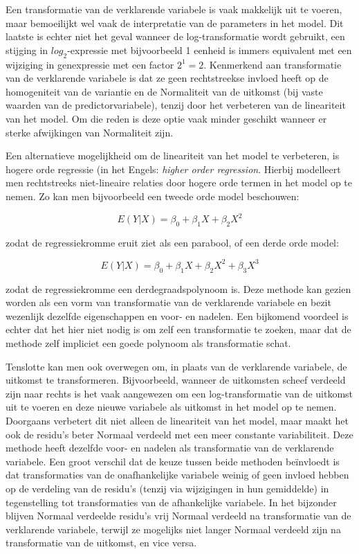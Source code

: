 \documentclass[
  12pt,dutch,coursenotes]{book}
\begin{document}
Een transformatie van de verklarende variabele is vaak makkelijk uit te voeren, maar bemoeilijkt wel vaak de interpretatie van de parameters in het model. Dit laatste is echter niet het geval wanneer de log-transformatie wordt gebruikt, een stijging in \(log_2\)-expressie met bijvoorbeeld 1 eenheid is immers equivalent met een wijziging in genexpressie met een factor \(2^1=2\). Kenmerkend aan transformatie van de verklarende variabele is dat ze geen rechtstreekse invloed heeft op de homogeniteit van de variantie en de Normaliteit van de uitkomst (bij vaste waarden van de predictorvariabele), tenzij door het verbeteren van de lineariteit van het model. Om die reden is deze optie vaak minder geschikt wanneer er sterke afwijkingen van Normaliteit zijn.

Een alternatieve mogelijkheid om de lineariteit van het model te verbeteren, is hogere orde regressie (in het Engels:
\emph{higher order regression}. Hierbij modelleert men rechtstreeks niet-lineaire relaties door hogere orde termen in het model op te nemen. Zo kan men bijvoorbeeld een tweede orde model beschouwen:

\[E(Y|X)=\beta_0+\beta_1X+\beta_2X^2\]

zodat de regressiekromme eruit ziet als een parabool, of een derde
orde model:

\[E(Y|X)=\beta_0+\beta_1X+\beta_2X^2+\beta_3X^3\]

zodat de regressiekromme een derdegraadspolynoom is. Deze methode kan gezien worden als een vorm van transformatie van de verklarende
variabele en bezit wezenlijk dezelfde eigenschappen en voor- en nadelen. Een bijkomend voordeel is echter dat het hier niet nodig is om zelf een transformatie te zoeken, maar dat de methode zelf impliciet een goede
polynoom als transformatie schat.

Tenslotte kan men ook overwegen om, in plaats van de verklarende variabele, de uitkomst te transformeren. Bijvoorbeeld, wanneer de uitkomsten scheef verdeeld zijn naar rechts is het vaak aangewezen om een log-transformatie van de uitkomst uit te voeren en deze nieuwe variabele als uitkomst in het model op te nemen. Doorgaans verbetert dit niet alleen de lineariteit van het model, maar maakt het ook de residu's beter Normaal verdeeld met een meer constante variabiliteit. Deze methode heeft dezelfde voor- en nadelen als transformatie van de verklarende variabele. Een groot verschil dat de keuze tussen beide methoden beïnvloedt is dat transformaties van de onafhankelijke variabele weinig of geen invloed hebben op de verdeling van de residu's (tenzij via wijzigingen in hun gemiddelde)
in tegenstelling tot transformaties van de afhankelijke variabele. In het bijzonder blijven Normaal verdeelde residu's vrij Normaal verdeeld na transformatie van de verklarende variabele, terwijl ze mogelijks niet langer Normaal verdeeld zijn na transformatie van de uitkomst, en vice versa.
\end{document}
